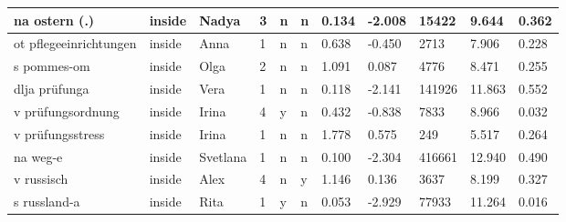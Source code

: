 \begin{longtable}{|p{4cm}|p{1cm}|p{1.2cm}|p{0.5cm}|p{0.5cm}|p{0.5cm}|R{1cm}|R{1cm}|R{1cm}|R{1cm}|R{1cm}|}
na ostern (.)              & inside            & Nadya         & 3                                   & n                          & n                          & 0.134      & -2.008        & 15422                   & 9.644                         & 0.362                   \\ \hline
ot pflegeeinrichtungen     & inside            & Anna          & 1                                   & n                          & n                          & 0.638      & -0.450        & 2713                    & 7.906                         & 0.228                   \\ \hline
s pommes-om                & inside            & Olga          & 2                                   & n                          & n                          & 1.091      & 0.087         & 4776                    & 8.471                         & 0.255                   \\ \hline
dlja pr\"{u}funga          & inside            & Vera          & 1                                   & n                          & n                          & 0.118      & -2.141        & 141926                  & 11.863                        & 0.552                   \\ \hline
v pr\"{u}fungsordnung      & inside            & Irina         & 4                                   & y                          & n                          & 0.432      & -0.838        & 7833                    & 8.966                         & 0.032                   \\ \hline
v pr\"{u}fungsstress       & inside            & Irina         & 1                                   & n                          & n                          & 1.778      & 0.575         & 249                     & 5.517                         & 0.264                   \\ \hline
na weg-e                   & inside            & Svetlana      & 1                                   & n                          & n                          & 0.100      & -2.304        & 416661                  & 12.940                        & 0.490                   \\ \hline
v russisch                 & inside            & Alex          & 4                                   & n                          & y                          & 1.146      & 0.136         & 3637                    & 8.199                         & 0.327                   \\ \hline
s russland-a               & inside            & Rita          & 1                                   & y                          & n                          & 0.053      & -2.929        & 77933                   & 11.264                        & 0.016                   \\ \hline

\end{longtable}
